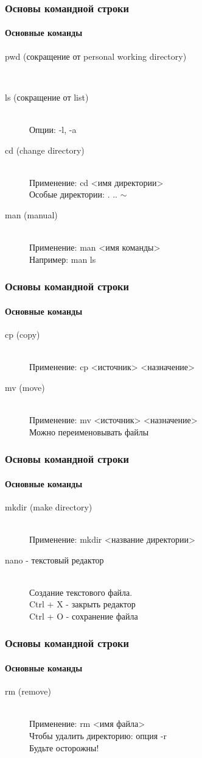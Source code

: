 \documentclass[12pt,pdf,hyperref={unicode}]{beamer}
\begin{document}
\begin{frame}
\frametitle{Основы командной строки} 
\framesubtitle{Основные команды}
\begin{description}
  \item[pwd (сокращение от personal working directory)] \hfill \\
  \item[ls (сокращение от list)] \hfill \\
  Опции: -l, -a
  \item[cd (change directory)] \hfill \\
  Применение: cd <имя директории> \\
  Особые директории: . ..  $\sim$
  \item[man (manual)] \hfill \\
  Применение: man <имя команды>\\
  Например: man ls
\end{description}
\end{frame}

\begin{frame}
\frametitle{Основы командной строки} 
\framesubtitle{Основные команды}
\begin{description}
  \item[cp (copy)] \hfill \\
  Применение: cp <источник> <назначение>
  \item[mv (move)] \hfill \\
  Применение: mv <источник> <назначение>\\
  Можно переименовывать файлы
\end{description}
\end{frame}

\begin{frame}
\frametitle{Основы командной строки} 
\framesubtitle{Основные команды}
\begin{description}
  \item[mkdir (make directory)] \hfill \\
  Применение: mkdir <название директории>
  \item[nano - текстовый редактор] \hfill \\
  Создание текстового файла.\\
  Ctrl + X - закрыть редактор\\
  Ctrl + O - сохранение файла
\end{description}
\end{frame}

\begin{frame}
\frametitle{Основы командной строки} 
\framesubtitle{Основные команды}
\begin{description}
  \item[rm (remove)] \hfill \\
  Применение: rm <имя файла> \\
  Чтобы удалить директорию: опция -r\\
  Будьте осторожны!
\end{description}
\end{frame}
\end{document}
